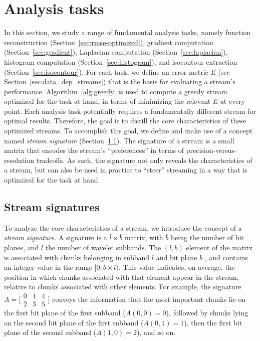 \section{Analysis tasks}
\label{sec:analysis-tasks}

In this section, we study a range of fundamental analysis tasks, namely function reconstruction
(Section~\ref{sec:rmse-optimized}), gradient computation (Section~\ref{sec:gradient}), Laplacian
computation (Section~\ref{sec:laplacian}), histogram computation (Section~\ref{sec:histogram}), and
isocontour extraction (Section~\ref{sec:isocontour}). For each task, we define an error metric $E$
(see Section~\ref{sec:data_dep_streams}) that is the basis for evaluating a stream's performance.
Algorithm~\ref{alg:greedy} is used to compute a greedy stream optimized for the task at hand, in
terms of minimizing the relevant $E$ at every point. Each analysis task potentially requires a
fundamentally different stream for optimal results. Therefore, the goal is to distill the core
characteristics of these optimized streams. To accomplish this goal, we define and make use of a
concept named \emph{stream signature} (Section~\ref{sec:stream-signature}). The signature of a
stream is a small matrix that encodes the stream's ``preferences'' in terms of
precision-versus-resolution tradeoffs. As such, the signature not only reveals the characteristics
of a stream, but can also be used in practice to ``steer'' streaming in a way that is optimized for
the task at hand.

\subsection{Stream signatures}
\label{sec:stream-signature}

To analyze the core characteristics of a stream, we introduce the concept of a \emph{stream
signature}. A signature is a $\bar{l} \times \bar{b}$ matrix, with $\bar{b}$ being the number of bit
planes, and $\bar{l}$ the number of wavelet subbands. The $(l,b)$ element of the matrix is
associated with chunks belonging in subband $l$ and bit plane $b$ , and contains an integer value in
the range $[0,\bar{b}\times \bar{l})$. This value indicates, on average, the position in which
chunks associated with that element appear in the stream, relative to chunks associated with other
elements. For example, the signature  $A=\bigl[
\begin{smallmatrix}0 & 1 & 4\\ 2 & 3 & 5\end{smallmatrix}\bigr]$ conveys the information that the
most important chunks lie on the first bit plane of the first subband ($A(0,0)=0$), followed by
chunks lying on the second bit plane of the first subband ($A(0,1)=1$), then the first bit plane of
the second subband ($A(1,0)=2$), and so on.

